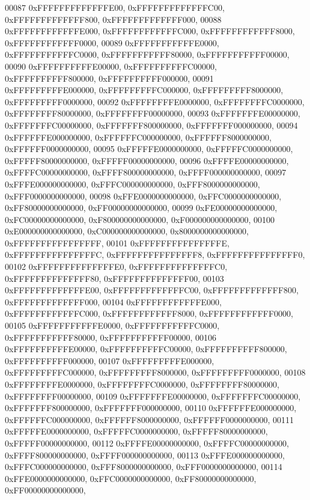 \begin{DoxyCode}
00087         0xFFFFFFFFFFFFFE00, 0xFFFFFFFFFFFFFC00, 0xFFFFFFFFFFFFF800, 0xFFFFFFFFFFFFF000,
00088         0xFFFFFFFFFFFFE000, 0xFFFFFFFFFFFFC000, 0xFFFFFFFFFFFF8000, 0xFFFFFFFFFFFF0000,
00089         0xFFFFFFFFFFFE0000, 0xFFFFFFFFFFFC0000, 0xFFFFFFFFFFF80000, 0xFFFFFFFFFFF00000,
00090         0xFFFFFFFFFFE00000, 0xFFFFFFFFFFC00000, 0xFFFFFFFFFF800000, 0xFFFFFFFFFF000000,
00091         0xFFFFFFFFFE000000, 0xFFFFFFFFFC000000, 0xFFFFFFFFF8000000, 0xFFFFFFFFF0000000,
00092         0xFFFFFFFFE0000000, 0xFFFFFFFFC0000000, 0xFFFFFFFF80000000, 0xFFFFFFFF00000000,
00093         0xFFFFFFFE00000000, 0xFFFFFFFC00000000, 0xFFFFFFF800000000, 0xFFFFFFF000000000,
00094         0xFFFFFFE000000000, 0xFFFFFFC000000000, 0xFFFFFF8000000000, 0xFFFFFF0000000000,
00095         0xFFFFFE0000000000, 0xFFFFFC0000000000, 0xFFFFF80000000000, 0xFFFFF00000000000,
00096         0xFFFFE00000000000, 0xFFFFC00000000000, 0xFFFF800000000000, 0xFFFF000000000000,
00097         0xFFFE000000000000, 0xFFFC000000000000, 0xFFF8000000000000, 0xFFF0000000000000,
00098         0xFFE0000000000000, 0xFFC0000000000000, 0xFF80000000000000, 0xFF00000000000000,
00099         0xFE00000000000000, 0xFC00000000000000, 0xF800000000000000, 0xF000000000000000,
00100         0xE000000000000000, 0xC000000000000000, 0x8000000000000000, 0xFFFFFFFFFFFFFFFF,
00101         0xFFFFFFFFFFFFFFFE, 0xFFFFFFFFFFFFFFFC, 0xFFFFFFFFFFFFFFF8, 0xFFFFFFFFFFFFFFF0,
00102         0xFFFFFFFFFFFFFFE0, 0xFFFFFFFFFFFFFFC0, 0xFFFFFFFFFFFFFF80, 0xFFFFFFFFFFFFFF00,
00103         0xFFFFFFFFFFFFFE00, 0xFFFFFFFFFFFFFC00, 0xFFFFFFFFFFFFF800, 0xFFFFFFFFFFFFF000,
00104         0xFFFFFFFFFFFFE000, 0xFFFFFFFFFFFFC000, 0xFFFFFFFFFFFF8000, 0xFFFFFFFFFFFF0000,
00105         0xFFFFFFFFFFFE0000, 0xFFFFFFFFFFFC0000, 0xFFFFFFFFFFF80000, 0xFFFFFFFFFFF00000,
00106         0xFFFFFFFFFFE00000, 0xFFFFFFFFFFC00000, 0xFFFFFFFFFF800000, 0xFFFFFFFFFF000000,
00107         0xFFFFFFFFFE000000, 0xFFFFFFFFFC000000, 0xFFFFFFFFF8000000, 0xFFFFFFFFF0000000,
00108         0xFFFFFFFFE0000000, 0xFFFFFFFFC0000000, 0xFFFFFFFF80000000, 0xFFFFFFFF00000000,
00109         0xFFFFFFFE00000000, 0xFFFFFFFC00000000, 0xFFFFFFF800000000, 0xFFFFFFF000000000,
00110         0xFFFFFFE000000000, 0xFFFFFFC000000000, 0xFFFFFF8000000000, 0xFFFFFF0000000000,
00111         0xFFFFFE0000000000, 0xFFFFFC0000000000, 0xFFFFF80000000000, 0xFFFFF00000000000,
00112         0xFFFFE00000000000, 0xFFFFC00000000000, 0xFFFF800000000000, 0xFFFF000000000000,
00113         0xFFFE000000000000, 0xFFFC000000000000, 0xFFF8000000000000, 0xFFF0000000000000,
00114         0xFFE0000000000000, 0xFFC0000000000000, 0xFF80000000000000, 0xFF00000000000000,

\end{DoxyCode}
